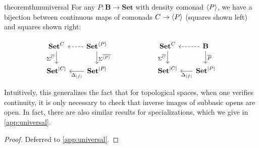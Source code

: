 \documentclass[11pt, oneside, article]{memoir}
\theoremstyle{plain}
\theoremstyle{definition}
\theoremstyle{remark}
\newenvironment{remark}
{\renewcommand\qedsymbol{$\lrcorner$}%
  \pushQED{\qed}\myremark}
{\popQED\endmyremark}
\DeclarePairedDelimiter{\gen}{\langle}{\rangle}
\DeclarePairedDelimiter{\abs}{\lvert}{\rvert}
\newcommand{\namedcat}[1]{\mathbf{#1}}
\newcommand{\cat}[1]{\mathbf{#1}}
\newcommand{\Set}{\namedcat{Set}}
\newcommand{\CoalgOn}[2]{{#2}^{#1}}
\newcommand{\CoalgSet}[1]{\CoalgOn{#1}{\Set}}
\newcommand{\clift}[1]{\overline{#1}}
\newcommand{\pts}[1]{{\abs{#1}}}
\newcommand{\one}[1]{\pts{#1}}
\newcommand{\ptlift}[1]{\overline{#1}}
\newcommand{\carr}{\Sigma}
\newcommand{\reindex}[1]{\Delta_{#1}}
\newcommand{\car}[1]{\carr^{#1}}
\newcommand{\ph}[1]{#1}
\newcommand{\cmnd}[1]{{#1}}
\newcommand{\cC}{\cmnd{C}}
\newcommand{\bB}{\cat{B}}
\newcommand{\pP}{\ph{P}}
\newcommand{\cP}{\gen{\pP}}
\newcommand{\CSet}{\CoalgSet{\cC}}
\newcommand{\PSet}{\CoalgSet{\cP}}
\newcommand{\SetpC}{\Set^\pts{\cC}}
\newcommand{\SetpP}{\Set^\pts{\pP}}
\begin{document}
\begin{restatable}{theorem}{thmuniversal}\label{thm:universal}
  For any $\pP \colon \bB \to \Set$ with density comonad $\cP$, we
  have a bijection between continuous maps of comonads $\cC \to \cP$
  (squares shown left) and squares shown right:
  
  \[
    \begin{tikzcd}[column sep=20, ampersand replacement=\&]
      \CSet \& \PSet \\
      {\SetpC} \& {\SetpP}
      \arrow["\car{\clift{\cC}}"', from=1-1, to=2-1]
      \arrow[dashed, from=1-2, to=1-1]
      \arrow["\car{\clift{\cP}}", from=1-2, to=2-2]
      \arrow["{\reindex{\one{f}}}", from=2-2, to=2-1]
    \end{tikzcd}
    \qquad\qquad\qquad
    \begin{tikzcd}[column sep=17.5, ampersand replacement=\&]
      \CSet \& \bB \\
      {\SetpC} \& {\SetpP}
      \arrow["\car{\clift{\cC}}"', from=1-1, to=2-1]
      \arrow[dashed, from=1-2, to=1-1]
      \arrow["\ptlift{\pP}", from=1-2, to=2-2]
      \arrow["{\reindex{\one{f}}}", from=2-2, to=2-1]
    \end{tikzcd}
  \]
\end{restatable}

Intuitively, this generalizes the fact that for topological spaces,
when one verifies continuity, it is only necessary to check that
inverse images of subbasic opens are open.
In fact, there are also similar results for specializations, which we
give in \cref{app:universal}.

\begin{proof}
  Deferred to \cref{app:universal}.
\end{proof}

\end{document}
